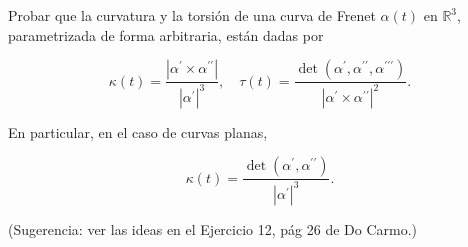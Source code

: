 \begin{problema}
Probar que la curvatura y la torsión de una curva de Frenet $\alpha(t)$ en $\mathbb{R}^{3}$, parametrizada de forma arbitraria, están dadas por

$$
\kappa(t)=\frac{\left|\alpha^{\prime} \times \alpha^{\prime \prime}\right|}{\left|\alpha^{\prime}\right|^{3}}, \quad \tau(t)=\frac{\operatorname{det}\left(\alpha^{\prime}, \alpha^{\prime \prime}, \alpha^{\prime \prime \prime}\right)}{\left|\alpha^{\prime} \times \alpha^{\prime \prime}\right|^{2}} .
$$

En particular, en el caso de curvas planas,

$$
\kappa(t)=\frac{\operatorname{det}\left(\alpha^{\prime}, \alpha^{\prime \prime}\right)}{\left|\alpha^{\prime}\right|^{3}} .
$$

(Sugerencia: ver las ideas en el Ejercicio 12, pág 26 de Do Carmo.)
\begin{sol}



\end{sol}
\end{problema}
